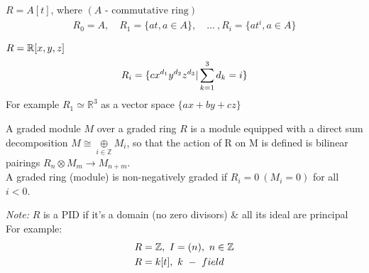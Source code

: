 \documentclass[11pt,a4paper]{report}
\begin{document}
              \begin{Ex}
                $ R = A[t]$, where  $(A \textrm{ - commutative ring})$
              \begin{align*}
                R_0 = A, \quad R_1 = \{at, a \in A\}, \quad \dots \ , R_i = \{at^i, a \in A\}
              \end{align*}
              \end{Ex}
              \begin{Ex}
                $R = \mathbb{R}[x,y,z]$ 
                \[
                R_i = \{cx^{d_{1}}y^{d_{2}}z^{d_{3}} | \sum^3_{k=1}d_k = i\}\\
                \]
              For example $R_1 \simeq \mathbb{R}^3$ as a vector space $\{ax + by + cz\}$\\
              \end{Ex}
              
              
               A graded module $M$ over a graded ring $R$ is a module equipped with a direct sum decomposition $M \cong \underset{i \in \mathbb{Z}}{\oplus} M_i$, so that the action of R on M is defined is bilinear pairings $R_n \otimes M_m \rightarrow M_{n+m}$. \\
              
              A graded ring (module) is non-negatively graded if $R_i = 0 \ (M_i = 0)$ for all $i < 0$.
              
              \emph{Note:} $R$ is a PID if it's a domain (no zero divisors) \& all its ideal are principal\\
              
             For example: 
              \begin{align*}
                &R = \mathbb{Z}, \ I = (n),\ n \in \mathbb{Z} \\
                &R = k[t],\ k\ -\ field\\
              \end{align*}
              
\end{document}
